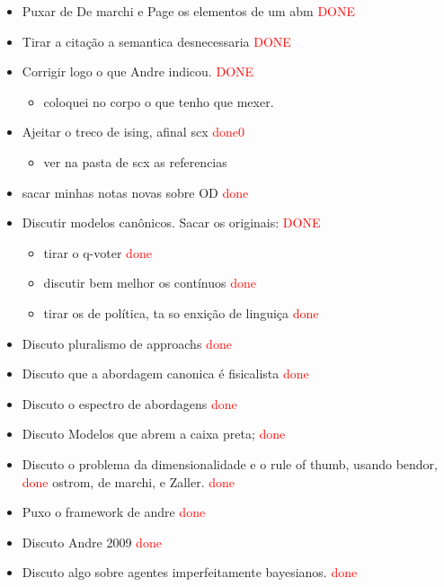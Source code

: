 \documentclass{article}
\begin{document}
\begin{itemize}
  \item Puxar de De marchi e Page os elementos de um abm \textcolor{red}{DONE}
  \item Tirar a citação a semantica desnecessaria \textcolor{red}{DONE}
  \item {\Large Corrigir logo o que Andre indicou.} \textcolor{red}{DONE}
      \begin{itemize}
      \item coloquei no corpo o que tenho que mexer.
    \end{itemize}
  \item Ajeitar o treco de ising, afinal scx  \textcolor{red}{done0}  
    \begin{itemize}
    \item ver na pasta de scx as referencias 
    \end{itemize}
  \item sacar minhas notas novas sobre OD \textcolor{red}{done}
  \item Discutir modelos canônicos. {\Large Sacar os originais}: \textcolor{red}{DONE}
  \begin{itemize}
  \item tirar o q-voter \textcolor{red}{done}
  \item discutir bem melhor os contínuos \textcolor{red}{done}
  \item tirar os de política, ta so enxição de linguiça \textcolor{red}{done}
  \end{itemize}


\item Discuto pluralismo de approachs \textcolor{red}{done}
\item Discuto que a abordagem canonica é fisicalista \textcolor{red}{done}
\item Discuto o espectro de abordagens \textcolor{red}{done}
\item Discuto Modelos que abrem a caixa preta; \textcolor{red}{done}
\item Discuto o problema da dimensionalidade e o rule of thumb, usando bendor, \textcolor{red}{done}
  ostrom, de marchi, e Zaller. \textcolor{red}{done}
\item Puxo o framework de andre \textcolor{red}{done}
\item Discuto Andre 2009 \textcolor{red}{done}
\item Discuto algo sobre agentes imperfeitamente bayesianos. \textcolor{red}{done}

  
\end{itemize}
\end{document}
